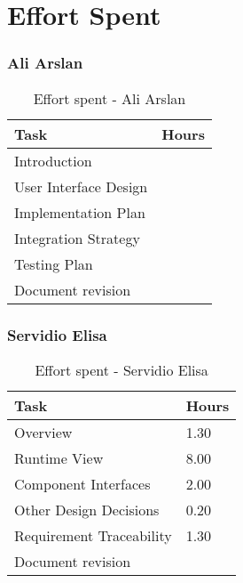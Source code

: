 \chapter{Effort Spent}

\subsection{Ali Arslan}
\renewcommand{\arraystretch}{2}
\begin{longtable}{|m{9cm}|m{1.2cm}|}
\caption{Effort spent - Ali Arslan}\\
\hline
\endfirsthead
\endhead
\hline
\endlastfoot
\rowcolor{green2}
\textbf{Task} & \hfil {\textbf{Hours}}\\
\hline
Introduction & \hfil \\
User Interface Design & \hfil \\
Implementation Plan & \hfil \\
Integration Strategy & \hfil \\
Testing Plan & \hfil \\
Document revision & \hfil \\
\hline
\end{longtable}

\subsection{Servidio Elisa}
\renewcommand{\arraystretch}{2}
\begin{longtable}{|m{9cm}|m{1.2cm}|}
\caption{Effort spent - Servidio Elisa}\\
\hline
\endfirsthead
\endhead
\hline
\endlastfoot
\rowcolor{green2}
\textbf{Task} &\hfil {\textbf{Hours}}\\
\hline
Overview & \hfil 1.30 \\
Runtime View & \hfil 8.00 \\
Component Interfaces & \hfil 2.00\\
Other Design Decisions & \hfil 0.20\\
Requirement Traceability  & \hfil 1.30\\
Document revision & \hfil \\
\hline
\end{longtable}

